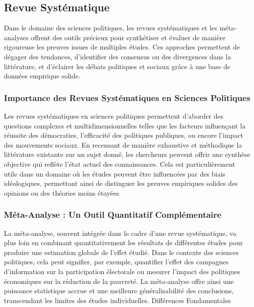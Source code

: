 \documentclass[
  letterpaper,
]{scrbook}
\begin{document}
\hypertarget{revue-systuxe9matique}{%
\subsection{Revue Systématique}\label{revue-systuxe9matique}}

Dans le domaine des sciences politiques, les revues systématiques et les
méta-analyses offrent des outils précieux pour synthétiser et évaluer de
manière rigoureuse les preuves issues de multiples études. Ces approches
permettent de dégager des tendances, d'identifier des consensus ou des
divergences dans la littérature, et d'éclairer les débats politiques et
sociaux grâce à une base de données empirique solide.

\hypertarget{importance-des-revues-systuxe9matiques-en-sciences-politiques}{%
\subsubsection{Importance des Revues Systématiques en Sciences
Politiques}\label{importance-des-revues-systuxe9matiques-en-sciences-politiques}}

Les revues systématiques en sciences politiques permettent d'aborder des
questions complexes et multidimensionnelles telles que les facteurs
influençant la réussite des démocraties, l'efficacité des politiques
publiques, ou encore l'impact des mouvements sociaux. En recensant de
manière exhaustive et méthodique la littérature existante sur un sujet
donné, les chercheurs peuvent offrir une synthèse objective qui reflète
l'état actuel des connaissances. Cela est particulièrement utile dans un
domaine où les études peuvent être influencées par des biais
idéologiques, permettant ainsi de distinguer les preuves empiriques
solides des opinions ou des théories moins étayées.

\hypertarget{muxe9ta-analyse-un-outil-quantitatif-compluxe9mentaire}{%
\subsubsection{Méta-Analyse : Un Outil Quantitatif
Complémentaire}\label{muxe9ta-analyse-un-outil-quantitatif-compluxe9mentaire}}

La méta-analyse, souvent intégrée dans le cadre d'une revue
systématique, va plus loin en combinant quantitativement les résultats
de différentes études pour produire une estimation globale de l'effet
étudié. Dans le contexte des sciences politiques, cela peut signifier,
par exemple, quantifier l'effet des campagnes d'information sur la
participation électorale ou mesurer l'impact des politiques économiques
sur la réduction de la pauvreté. La méta-analyse offre ainsi une
puissance statistique accrue et une meilleure généralisabilité des
conclusions, transcendant les limites des études individuelles.
Différences Fondamentales
\end{document}
